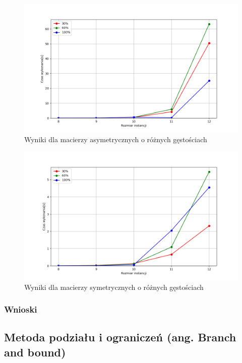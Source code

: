 \documentclass{article}
\begin{document}
  \begin{figure}[ht]
    \centering
    \includegraphics[width=\textwidth]{src/plots/asymbrute-forceresoult.png}
    \caption{Wyniki dla macierzy asymetrycznych o różnych gęstościach}
    \label{fig:asm_bf}
  \end{figure}
  \begin{figure}[ht]
    \centering
    \includegraphics[width=\textwidth]{src/plots/symbrute-forceresoult.png}
    \caption{Wyniki dla macierzy symetrycznych o różnych gęstościach}
    \label{fig:sm_bf}
  \end{figure}
  \FloatBarrier
  \subsubsection{Wnioski}

  \subsection{Metoda podziału i ograniczeń (ang. Branch and bound)}
\end{document}
